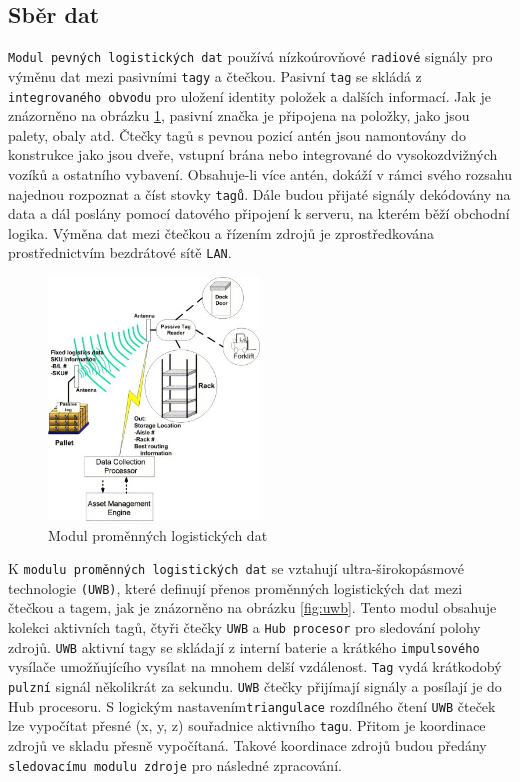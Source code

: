 \documentclass[czech,BP]{thesiskiv}
\begin{document}
\subsection{Sběr dat}

\texttt{Modul pevných logistických dat} používá nízkoúrovňové \texttt{radiové} signály pro výměnu dat mezi pasivními \texttt{tagy} a čtečkou. Pasivní \texttt{tag} se skládá z \texttt{integrovaného obvodu} pro uložení identity položek a dalších informací. Jak je znázorněno na obrázku \ref{fig:passive}, pasivní značka je připojena na položky, jako jsou palety, obaly atd. Čtečky tagů s pevnou pozicí antén jsou namontovány do konstrukce jako jsou dveře, vstupní brána nebo integrované do vysokozdvižných vozíků a ostatního vybavení. Obsahuje-li více antén, dokáží v rámci svého rozsahu najednou rozpoznat a číst stovky \texttt{tagů}. Dále budou přijaté signály dekódovány na data a dál poslány pomocí datového připojení k serveru, na kterém běží obchodní logika. Výměna dat mezi čtečkou a řízením zdrojů je zprostředkována prostřednictvím bezdrátové sítě \texttt{LAN}.\cite{chow2006design}
\newpage

\begin{figure}[ht]
		\centering
		\includegraphics[width=0.5\textwidth]{../images/passive.jpg}	
		\caption{Modul proměnných logistických dat\cite{chow2006design}}
		\label{fig:passive}
\end{figure}

K \texttt{modulu proměnných logistických dat} se vztahují ultra-širokopásmové technologie \texttt{(UWB)}, které definují přenos proměnných logistických dat mezi čtečkou a tagem, jak je znázorněno na obrázku \ref{fig:uwb}. Tento modul obsahuje kolekci aktivních tagů, čtyři čtečky \texttt{UWB} a \texttt{Hub procesor} pro sledování polohy zdrojů. \texttt{UWB} aktivní tagy se skládají z interní baterie a krátkého \texttt{impulsového} vysílače umožňujícího vysílat na mnohem delší vzdálenost. \texttt{Tag} vydá krátkodobý \texttt{pulzní} signál několikrát za sekundu. \texttt{UWB} čtečky přijímají signály a posílají je do Hub procesoru. S logickým nastavením\texttt{triangulace} rozdílného čtení \texttt{UWB} čteček lze vypočítat přesné (x, y, z) souřadnice aktivního \texttt{tagu}. Přitom je koordinace zdrojů ve skladu přesně vypočítaná. Takové koordinace zdrojů budou předány \texttt{sledovacímu modulu zdroje} pro následné zpracování.\cite{chow2006design}
\end{document}
